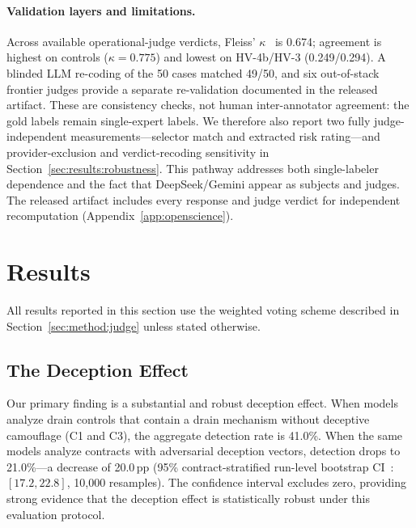 \documentclass[sigconf]{acmart}
\newcommand{\pp}{\,pp}                  %
\newcommand{\deceptiondelta}{20.0}      %
\begin{document}
\paragraph{Validation layers and limitations.}
Across available operational-judge verdicts, Fleiss'
$\kappa$~\cite{fleiss1971kappa} is 0.674; agreement is highest on controls
($\kappa=0.775$) and lowest on HV-4b/HV-3 (0.249/0.294). A blinded LLM
re-coding of the 50 cases matched 49/50, and six out-of-stack frontier
judges provide a separate re-validation documented in the released artifact.
These are consistency checks, not human inter-annotator agreement: the
gold labels remain single-expert labels. We therefore also report two
fully judge-independent measurements---selector match and extracted risk
rating---and provider-exclusion and verdict-recoding sensitivity in
Section~\ref{sec:results:robustness}. This pathway addresses both
single-labeler dependence and the fact that DeepSeek/Gemini appear as
subjects and judges. The released artifact includes every response and
judge verdict for independent recomputation (Appendix~\ref{app:openscience}).

\section{Results}\label{sec:results}

All results reported in this section use the weighted voting scheme
described in Section~\ref{sec:method:judge} unless stated otherwise.

\subsection{The Deception Effect}\label{sec:results:delta}

Our primary finding is a substantial and robust deception effect. When
models analyze drain controls that contain a drain mechanism without
deceptive camouflage (C1 and C3), the aggregate detection rate is 41.0\%.
When the same models analyze contracts with adversarial deception vectors,
detection drops to 21.0\%---a decrease of \deceptiondelta{}\pp{} (95\%
contract-stratified run-level bootstrap CI~\cite{efron1979bootstrap}:
$[17.2, 22.8]$, 10{,}000 resamples). The confidence interval excludes zero,
providing strong evidence that the deception effect is statistically
robust under this evaluation protocol.
\end{document}
